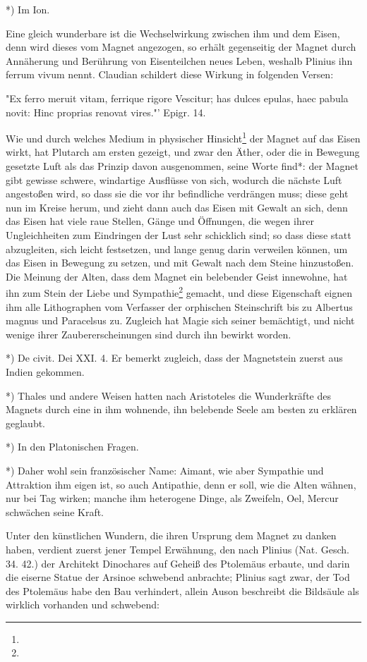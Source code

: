 \documentclass[a4paper, 11pt, oneside, polutonikogreek, german]{article}
\begin{document}
*) Im Ion.

Eine gleich wunderbare ist die Wechselwirkung zwischen ihm und dem Eisen, denn wird dieses vom Magnet angezogen, so erhält gegenseitig der Magnet durch Annäherung und Berührung von Eisenteilchen neues Leben, weshalb Plinius ihn ferrum vivum nennt. Claudian schildert diese Wirkung in folgenden Versen:

"Ex ferro meruit vitam, ferrique rigore
Vescitur; has dulces epulas, haec pabula
novit: Hinc proprias renovat vires."' Epigr. 14.

Wie und durch welches Medium in physischer Hinsicht\footnote{} der Magnet auf das Eisen wirkt, hat Plutarch am ersten gezeigt, und zwar den Äther, oder die in Bewegung gesetzte Luft als das Prinzip davon ausgenommen, seine Worte find*: der Magnet gibt gewisse schwere, windartige Ausflüsse von sich, wodurch die nächste Luft angestoßen wird, so dass sie die vor ihr befindliche verdrängen muss; diese geht nun im Kreise herum, und zieht dann auch das Eisen mit Gewalt an sich, denn das Eisen hat viele raue Stellen, Gänge und Öffnungen, die wegen ihrer Ungleichheiten zum Eindringen der Lust sehr schicklich sind; so dass diese statt abzugleiten, sich leicht festsetzen, und lange genug darin verweilen können, um das Eisen in Bewegung zu setzen, und mit Gewalt nach dem Steine hinzustoßen. Die Meinung der Alten, dass dem Magnet ein belebender Geist innewohne, hat ihn zum Stein der Liebe und Sympathie\footnote{} gemacht, und diese Eigenschaft eignen ihm alle Lithographen vom Verfasser der orphischen Steinschrift bis zu Albertus magnus und Paracelsus zu. Zugleich hat Magie sich seiner bemächtigt, und nicht wenige ihrer Zaubererscheinungen sind durch ihn bewirkt worden.

*) De civit. Dei XXI. 4. Er bemerkt zugleich, dass der Magnetstein zuerst aus Indien gekommen.

*) Thales und andere Weisen hatten nach Aristoteles die Wunderkräfte des Magnets durch eine in ihm wohnende, ihn belebende Seele am besten zu erklären geglaubt.

*) In den Platonischen Fragen.

*) Daher wohl sein französischer Name: Aimant, wie aber Sympathie und Attraktion ihm eigen ist, so auch Antipathie, denn er soll, wie die Alten wähnen, nur bei Tag wirken; manche ihm heterogene Dinge, als Zweifeln, Oel, Mercur schwächen seine Kraft.

Unter den künstlichen Wundern, die ihren Ursprung dem Magnet zu danken haben, verdient zuerst jener Tempel Erwähnung, den nach Plinius (Nat. Gesch. 34. 42.) der Architekt Dinochares auf Geheiß des Ptolemäus erbaute, und darin die eiserne Statue der Arsinoe schwebend anbrachte; Plinius sagt zwar, der Tod des Ptolemäus habe den Bau verhindert, allein Auson beschreibt die Bildsäule als wirklich vorhanden und schwebend:
\end{document}

